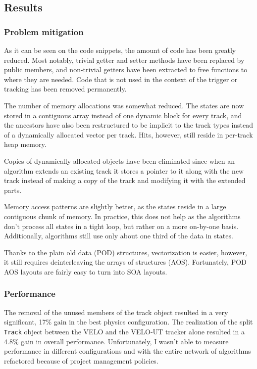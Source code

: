 \documentclass[12pt]{article}
\newcommand{\code}[1]{\texttt{#1}}
\begin{document}
\subsection{Results}

\subsubsection{Problem mitigation}

As it can be seen on the code snippets, the amount of code has been greatly reduced. Most notably, trivial getter and setter methods have been replaced by public members, and non-trivial getters have been extracted to free functions to where they are needed. Code that is not used in the context of the trigger or tracking has been removed permanently.

\vspace{1pc}
The number of memory allocations was somewhat reduced. The states are now stored in a contiguous array instead of one dynamic block for every track, and the ancestors have also been restructured to be implicit to the track types instead of a dynamically allocated vector per track. Hits, however, still reside in per-track heap memory.

\vspace{1pc}
Copies of dynamically allocated objects have been eliminated since when an algorithm extends an existing track it stores a pointer to it along with the new track instead of making a copy of the track and modifying it with the extended parts.

\vspace{1pc}
Memory access patterns are slightly better, as the states reside in a large contiguous chunk of memory. In practice, this does not help as the algorithms don't process all states in a tight loop, but rather on a more on-by-one basis. Additionally, algorithms still use only about one third of the data in states.

\vspace{1pc}
Thanks to the plain old data (POD) structures, vectorization is easier, however, it still requires deinterleaving the arrays of structures (AOS). Fortunately, POD AOS layouts are fairly easy to turn into SOA layouts.


\subsubsection{Performance}

The removal of the unused members of the track object resulted in a very significant, 17\% gain in the best physics configuration. The realization of the split \code{Track} object between the VELO and the VELO-UT tracker alone resulted in a 4.8\% gain in overall performance. Unfortunately, I wasn't able to measure performance in different configurations and with the entire network of algorithms refactored because of project management policies.
\end{document}
